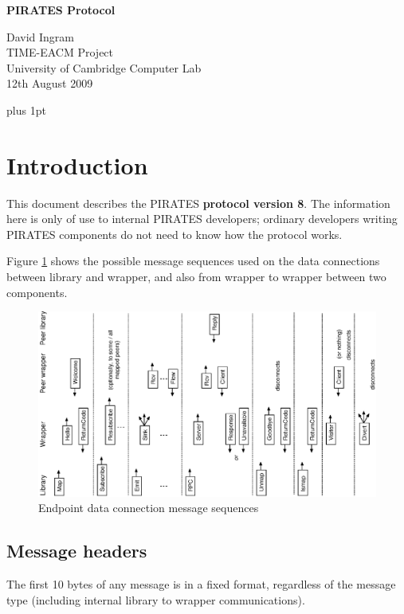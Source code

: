 \documentclass[12pt,a4paper,twoside]{article}
\renewcommand{\_}{\texttt{\symbol{95}}}
\begin{document}
\centerline{\textbf{\LARGE PIRATES Protocol}}
\begin{center} \large
David Ingram\\
TIME-EACM Project\\
University of Cambridge Computer Lab\\
12th August 2009\\
\end{center}

{ \parskip 1mm plus 1pt \tableofcontents }
\pagestyle{fancy}

\newpage
\section{Introduction}
\label{intro}

This document describes the PIRATES \textbf{protocol version 8}.
The information here is only of use to internal PIRATES developers;
ordinary developers writing PIRATES components do not need to know
how the protocol works.

Figure \ref{dataseq} shows the possible message sequences used
on the data connections between library and wrapper, and also from
wrapper to wrapper between two components.

\begin{figure}[h]
\centering
\includegraphics[scale=0.9,angle=-90]{diagrams/dataseq.eps}
\caption{Endpoint data connection message sequences}
\label{dataseq}
\end{figure}
\newpage

\subsection{Message headers}

The first 10 bytes of any message is in a fixed format,
regardless of the message type (including internal library to
wrapper communications).
\end{document}
